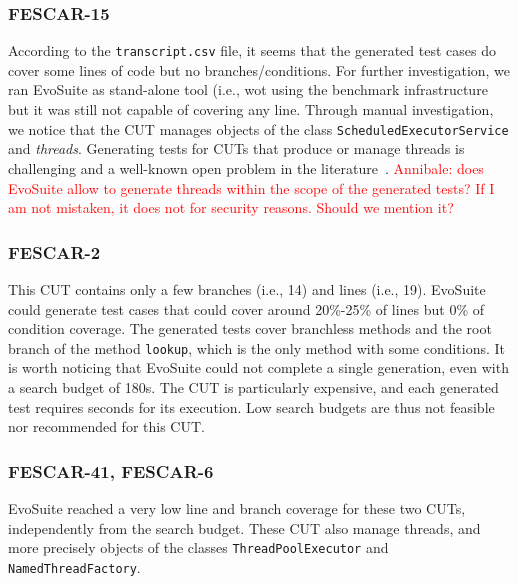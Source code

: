 \documentclass[sigconf]{acmart}
\newcommand{\EVOSUITE}{{\sc EvoSuite}\xspace}
\begin{document}

\subsubsection*{FESCAR-15} According to the \texttt{transcript.csv} file, it
seems that the generated test cases do cover some lines of code but no
branches/conditions.  
For further investigation, we ran \EVOSUITE as stand-alone tool (i.e., wot using the benchmark infrastructure but it was still not capable of covering any line. Through manual investigation, we notice that the CUT manages objects of the class \texttt{ScheduledExecutorService} and \textit{threads}. Generating tests for CUTs that produce or manage threads is challenging and a well-known open problem in the literature~\cite{FrA13a}.
\textcolor{red}{Annibale: does EvoSuite allow to generate threads within the scope of the generated tests? If I am not mistaken, it does not for security reasons. Should we mention it?
}


\subsubsection*{FESCAR-2} This CUT contains only a few branches (i.e., 14) and lines (i.e., 19). \EVOSUITE could generate test cases that could cover around 20\%-25\% of lines but 0\% of condition coverage. The generated tests cover branchless methods and the root branch of the method \texttt{lookup}, which is the only method with some conditions. It is worth noticing that \EVOSUITE could not complete a single generation, even with a search budget of 180s. The CUT is particularly expensive, and each generated test requires seconds for its execution. Low search budgets are thus not feasible nor recommended for this CUT.

\subsubsection*{FESCAR-41, FESCAR-6} \EVOSUITE reached a very low line and branch coverage for these two CUTs, independently from the search budget. These CUT also manage threads, and more precisely objects of the classes \texttt{ThreadPoolExecutor} and \texttt{NamedThreadFactory}.

\end{document}

